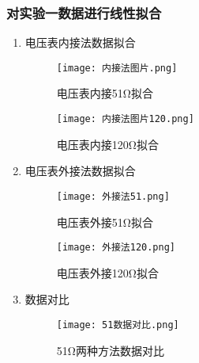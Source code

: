 \documentclass[dvipsnames, svgnames,a4paper,11pt]{article}
\begin{document}
	\subsubsection{对实验一数据进行线性拟合}
	\begin{enumerate}
		\item 电压表内接法数据拟合
			\begin{figure}[H]
			\centering
			\texttt{[image: 内接法图片.png]}
			\caption{电压表内接51Ω拟合}
			\label{电压表内接51Ω拟合}
		\end{figure}
		
			\begin{figure}[H]
			\centering
			\texttt{[image: 内接法图片120.png]}
			\caption{电压表内接120Ω拟合}
			\label{电压表内接120Ω拟合}
		\end{figure}
		\clearpage
			\item 电压表外接法数据拟合
				\begin{figure}[H]
				\centering
				\texttt{[image: 外接法51.png]}
				\caption{电压表外接51Ω拟合}
				\label{电压表外接51Ω拟合}
			\end{figure}
			
			\begin{figure}[H]
				\centering
				\texttt{[image: 外接法120.png]}
				\caption{电压表外接120Ω拟合}
				\label{电压表外接120Ω拟合}
			\end{figure}
				\item 数据对比
					\begin{figure}[H]
					\centering
					\texttt{[image: 51数据对比.png]}
					\caption{51Ω两种方法数据对比}
					\label{51Ω两种方法数据对比}
				\end{figure}
				

\end{enumerate}
\end{document}
